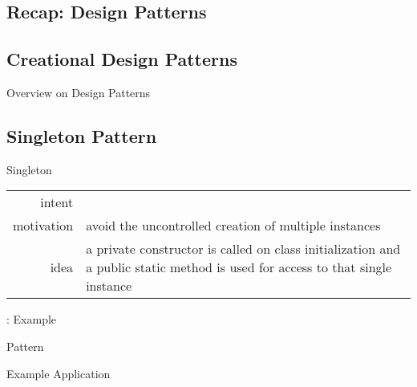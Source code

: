 \subsection{Recap: Design Patterns}
\slideDesignPatterns

\subsection{Creational Design Patterns}
\begin{frame}[label=creationalpatterns]{Overview on Design Patterns \mytitlesource{\gof}}
	\centering{}
\end{frame}

\subsection{Singleton Pattern}
\begin{frame}{\insertsubsection} %
	\begin{fancycolumns}
		\begin{definition}{Singleton \mysource{\gof}}
			\setlength\tabcolsep{1mm}
			\begin{tabularx}{\textwidth}{rX}				
				intent & \mycite{Ensure a class [has only] one instance, and provide a global point of access to it.}\\
				motivation & avoid the uncontrolled creation of multiple instances\\
				idea & a private constructor is called on class initialization and a public static method is used for access to that single instance
			\end{tabularx}
		\end{definition}
		\nextcolumn
		\centering{}
	\end{fancycolumns}
\end{frame}

\begin{frame}{\insertsubsection: Example} %
	\begin{fancycolumns}
		\begin{definitiontight}{Pattern}
			\centering\singleton{width=.5\linewidth}		
		\end{definitiontight}
		\nextcolumn
		\begin{exampletight}{Example Application}
			\centering\singletonexample{width=.5\linewidth}
		\end{exampletight}
	\end{fancycolumns}
\end{frame}

